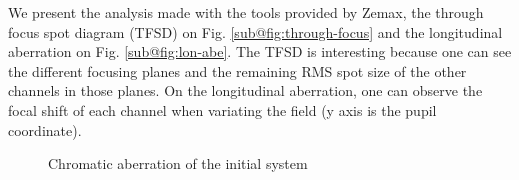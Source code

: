 \documentclass[10pt,letterpaper]{article}
\begin{document}
We present the analysis made with the tools provided by Zemax, the through focus spot diagram (TFSD) on Fig. \ref{sub@fig:through-focus} and the longitudinal aberration on Fig. \ref{sub@fig:lon-abe}. The TFSD is interesting because one can see the different focusing planes and the remaining RMS spot size of the other channels in those planes. On the longitudinal aberration, one can observe the focal shift of each channel when variating the field (y axis is the pupil coordinate).

\begin{figure}[h]
    \centering
	\caption{Chromatic aberration of the initial system}
\end{figure}
\end{document}
